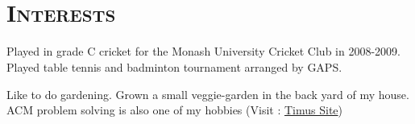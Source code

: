 \begin{resume}


\vspace{-0.4cm}
\begin{formatb}
  \\
  \body\\
\end{formatb}

\section{\textsc{Interests}}

\begin{position}
Played in grade C cricket for the Monash University Cricket Club in 2008-2009. Played table tennis and badminton tournament arranged by GAPS.    
\end{position}
\vspace{-0.2cm}
\begin{position}
Like to do gardening. Grown a small veggie-garden in the back yard of my house. ACM problem solving is also one of my hobbies (Visit : \href{http://acm.timus.ru/author.aspx?id=67901}{Timus Site})   
\end{position}
\vspace{-0.7cm}


\end{resume}
